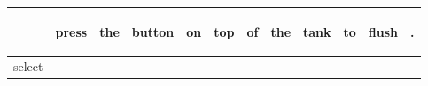 \documentclass[landscape]{article}
\newcommand{\ssp}{\hspace{2pt}}
\begin{document}
\noindent\begin{tabular}{|l|p{10pt}|p{10pt}|p{10pt}|p{10pt}|p{10pt}|p{10pt}|p{10pt}|p{10pt}|p{10pt}|p{10pt}|p{10pt}|}
\hline
&\begin{sideways}\cellcolor{ref0}press\hspace{12pt}\end{sideways}&\begin{sideways}\cellcolor{ref1}the\hspace{12pt}\end{sideways}&\begin{sideways}\cellcolor{ref2}button\hspace{12pt}\end{sideways}&\begin{sideways}\cellcolor{ref3}on\hspace{12pt}\end{sideways}&\begin{sideways}\cellcolor{ref4}top\hspace{12pt}\end{sideways}&\begin{sideways}\cellcolor{ref5}of\hspace{12pt}\end{sideways}&\begin{sideways}\cellcolor{ref6}the\hspace{12pt}\end{sideways}&\begin{sideways}\cellcolor{ref7}tank\hspace{12pt}\end{sideways}&\begin{sideways}\cellcolor{ref8}to\hspace{12pt}\end{sideways}&\begin{sideways}\cellcolor{ref9}flush\hspace{12pt}\end{sideways}&\begin{sideways}\cellcolor{ref10}.\hspace{12pt}\end{sideways}\\
\hline
\ssp select \ssp&\hspace{2pt}&\hspace{2pt}&\hspace{2pt}&\hspace{2pt}&\hspace{2pt}&\hspace{2pt}&\hspace{2pt}&\hspace{2pt}&\hspace{2pt}&\hspace{2pt}&\hspace{2pt}\\

\end{tabular}
\end{document}
